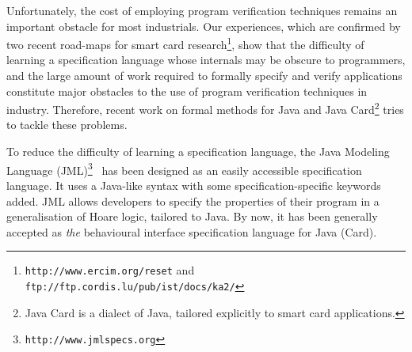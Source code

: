 Unfortunately, the cost of employing program verification techniques
remains an important obstacle for most industrials. Our experiences,
which are confirmed by two recent road-maps for smart card
research\footnote{\texttt{http://www.ercim.org/reset} and
\texttt{ftp://ftp.cordis.lu/pub/ist/docs/ka2/}}, show that the difficulty of
learning a specification language whose internals may be obscure to
programmers, and the large amount of work required to formally specify
and verify applications constitute major obstacles to the use of
program verification techniques in industry. Therefore, recent work on
formal methods for Java and Java Card\footnote{Java Card is a dialect
of Java, tailored explicitly to smart card applications.} tries to
tackle these problems.




To reduce the difficulty of learning a specification language, the
Java Modeling Language
(JML)\footnote{\texttt{http://www.jmlspecs.org}}~\cite{BurdyCCEKLLP03}
has been designed as an easily accessible specification language. It
uses a Java-like syntax with some specification-specific keywords
added.  JML allows developers to specify the properties of their
program in a generalisation of Hoare logic, tailored to Java.  By now,
it has been generally accepted as
\emph{the} behavioural interface specification language for Java
(Card).


